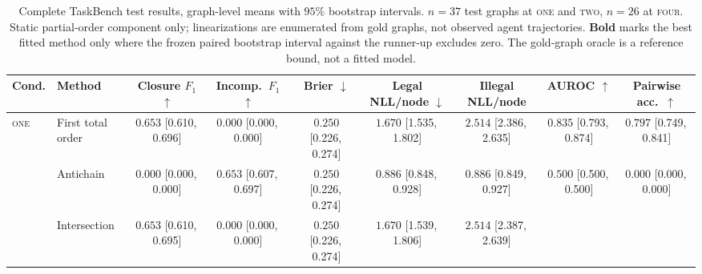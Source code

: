 %

\begin{landscape}
\begin{table}[p]
\centering
\footnotesize
\setlength{\tabcolsep}{3.5pt}
\caption{%
Complete TaskBench test results, graph-level means with $95\%$ bootstrap
intervals. $n = 37$ test graphs at \textsc{one} and \textsc{two}, $n = 26$ at
\textsc{four}. Static partial-order component only; linearizations are
enumerated from gold graphs, not observed agent trajectories.
\textbf{Bold} marks the best fitted method only where the frozen paired
bootstrap interval against the runner-up excludes zero. The gold-graph oracle
is a reference bound, not a fitted model.%
}
\label{tab:taskbench-appendix}
\begin{tabular}{@{}ll ccccccc@{}}
\toprule
Cond. & Method
& Closure $F_1$ $\uparrow$ & Incomp.\ $F_1$ $\uparrow$ & Brier $\downarrow$
& Legal NLL/node $\downarrow$ & Illegal NLL/node
& AUROC $\uparrow$ & Pairwise acc.\ $\uparrow$ \\
\midrule
\multirow{5}{*}{\textsc{one}}
 & First total order
   & $0.653$ \tiny[0.610,\,0.696]
   & $0.000$ \tiny[0.000,\,0.000]
   & $0.250$ \tiny[0.226,\,0.274]
   & $1.670$ \tiny[1.535,\,1.802]
   & $2.514$ \tiny[2.386,\,2.635]
   & $0.835$ \tiny[0.793,\,0.874]
   & $0.797$ \tiny[0.749,\,0.841] \\
 & Antichain
   & $0.000$ \tiny[0.000,\,0.000]
   & $\mathbf{0.653}$ \tiny[0.607,\,0.697]
   & $0.250$ \tiny[0.226,\,0.274]
   & $0.886$ \tiny[0.848,\,0.928]
   & $0.886$ \tiny[0.849,\,0.927]
   & $0.500$ \tiny[0.500,\,0.500]
   & $0.000$ \tiny[0.000,\,0.000] \\
 & Intersection
   & $\mathbf{0.653}$ \tiny[0.610,\,0.695]
   & $0.000$ \tiny[0.000,\,0.000]
   & $0.250$ \tiny[0.226,\,0.274]
   & $1.670$ \tiny[1.539,\,1.806]
   & $2.514$ \tiny[2.387,\,2.639]

\end{tabular}
\end{table}
\end{landscape}
